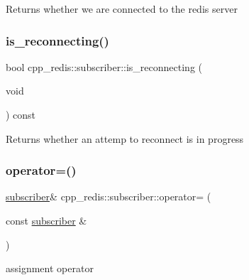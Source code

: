 \begin{DoxyReturn}{Returns}
whether we are connected to the redis server 
\end{DoxyReturn}
\mbox{\label{classcpp__redis_1_1subscriber_a32eb4feb4858c972ebb9887d21cb62d7}} 
\subsubsection{\texorpdfstring{is\+\_\+reconnecting()}{is\_reconnecting()}}
{\footnotesize\ttfamily bool cpp\+\_\+redis\+::subscriber\+::is\+\_\+reconnecting (\begin{DoxyParamCaption}\item[{void}]{ }\end{DoxyParamCaption}) const}

\begin{DoxyReturn}{Returns}
whether an attemp to reconnect is in progress 
\end{DoxyReturn}
\mbox{\label{classcpp__redis_1_1subscriber_ac60f83e6e915073bda6853baaeb39485}} 
\subsubsection{\texorpdfstring{operator=()}{operator=()}}
{\footnotesize\ttfamily \hyperlink{classcpp__redis_1_1subscriber}{subscriber}\& cpp\+\_\+redis\+::subscriber\+::operator= (\begin{DoxyParamCaption}\item[{const \hyperlink{classcpp__redis_1_1subscriber}{subscriber} \&}]{ }\end{DoxyParamCaption})\hspace{0.3cm}{\ttfamily [delete]}}



assignment operator 

\mbox{\label{classcpp__redis_1_1subscriber_a52605edb2a85d370680c3c9e1b84fc3b}} 
